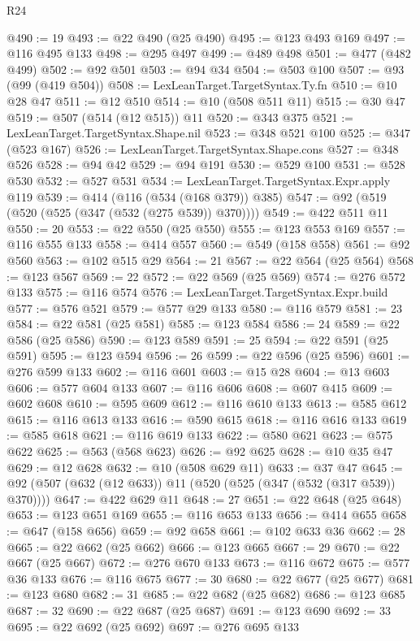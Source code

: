 \begin{lexlean}{R24}
\begin{coremodule}
{{{{{{{{{{{{{{{{{{{{{{{{{{{{{{{{{{{{{{{{{{{{{{{{{{{{{{{{{{{{{{{{{{{{{{{{{{{{{{{{{{{{{{{{{{{{{{{{{{{{{{{{{{{{{{{{{{{{{{{{{{{{{{{{{{{{{{{{{{{{{{{{{{{{{{{{{{{{{{{{{{{{{{{{{{{{{{{{{{{{{{{{{{{{{{{{{{{@490 := 19
@493 := @22 @490 (@25 @490)
@495 := @123 @493 @169
@497 := @116 @495 @133
@498 := @295 @497
@499 := @489 @498
@501 := @477 (@482 @499)
@502 := @92 @501
@503 := @94 @34
@504 := @503 @100
@507 := @93 (@99 (@419 @504))
@508 := LexLeanTarget.TargetSyntax.Ty.fn
@510 := @10 @28 @47
@511 := @12 @510
@514 := @10 (@508 @511 @11)
@515 := @30 @47
@519 := @507 (@514 (@12 @515)) @11
@520 := @343 @375
@521 := LexLeanTarget.TargetSyntax.Shape.nil
@523 := @348 @521 @100
@525 := @347 (@523 @167)
@526 := LexLeanTarget.TargetSyntax.Shape.cons
@527 := @348 @526
@528 := @94 @42
@529 := @94 @191
@530 := @529 @100
@531 := @528 @530
@532 := @527 @531
@534 := LexLeanTarget.TargetSyntax.Expr.apply @119
@539 := @414 (@116 (@534 (@168 @379)) @385)
@547 := @92 (@519 (@520 (@525 (@347 (@532 (@275 @539)) @370))))
@549 := @422 @511 @11
@550 := 20
@553 := @22 @550 (@25 @550)
@555 := @123 @553 @169
@557 := @116 @555 @133
@558 := @414 @557
@560 := @549 (@158 @558)
@561 := @92 @560
@563 := @102 @515 @29
@564 := 21
@567 := @22 @564 (@25 @564)
@568 := @123 @567
@569 := 22
@572 := @22 @569 (@25 @569)
@574 := @276 @572 @133
@575 := @116 @574
@576 := LexLeanTarget.TargetSyntax.Expr.build
@577 := @576 @521
@579 := @577 @29 @133
@580 := @116 @579
@581 := 23
@584 := @22 @581 (@25 @581)
@585 := @123 @584
@586 := 24
@589 := @22 @586 (@25 @586)
@590 := @123 @589
@591 := 25
@594 := @22 @591 (@25 @591)
@595 := @123 @594
@596 := 26
@599 := @22 @596 (@25 @596)
@601 := @276 @599 @133
@602 := @116 @601
@603 := @15 @28
@604 := @13 @603
@606 := @577 @604 @133
@607 := @116 @606
@608 := @607 @415
@609 := @602 @608
@610 := @595 @609
@612 := @116 @610 @133
@613 := @585 @612
@615 := @116 @613 @133
@616 := @590 @615
@618 := @116 @616 @133
@619 := @585 @618
@621 := @116 @619 @133
@622 := @580 @621
@623 := @575 @622
@625 := @563 (@568 @623)
@626 := @92 @625
@628 := @10 @35 @47
@629 := @12 @628
@632 := @10 (@508 @629 @11)
@633 := @37 @47
@645 := @92 (@507 (@632 (@12 @633)) @11 (@520 (@525 (@347 (@532 (@317 @539)) @370))))
@647 := @422 @629 @11
@648 := 27
@651 := @22 @648 (@25 @648)
@653 := @123 @651 @169
@655 := @116 @653 @133
@656 := @414 @655
@658 := @647 (@158 @656)
@659 := @92 @658
@661 := @102 @633 @36
@662 := 28
@665 := @22 @662 (@25 @662)
@666 := @123 @665
@667 := 29
@670 := @22 @667 (@25 @667)
@672 := @276 @670 @133
@673 := @116 @672
@675 := @577 @36 @133
@676 := @116 @675
@677 := 30
@680 := @22 @677 (@25 @677)
@681 := @123 @680
@682 := 31
@685 := @22 @682 (@25 @682)
@686 := @123 @685
@687 := 32
@690 := @22 @687 (@25 @687)
@691 := @123 @690
@692 := 33
@695 := @22 @692 (@25 @692)
@697 := @276 @695 @133
}}}}}}}}}}}}}}}}}}}}}}}}}}}}}}}}}}}}}}}}}}}}}}}}}}}}}}}}}}}}}}}}}}}}}}}}}}}}}}}}}}}}}}}}}}}}}}}}}}}}}}}}}}}}}}}}}}}}}}}}}}}}}}}}}}}}}}}}}}}}}}}}}}}}}}}}}}}}}}}}}}}}}}}}}}}}}}}}}}}}}}}}}}}}}}}}}}}
\end{coremodule}
\end{lexlean}
